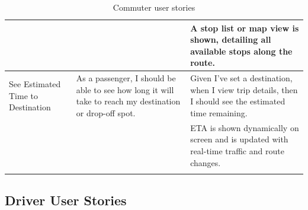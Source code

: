 \documentclass[a4paper,12pt]{article}
\begin{document}
\begin{longtable}{|p{4cm}|p{6cm}|p{5cm}|}
& & A stop list or map view is shown, detailing all available stops along the route. \\
\hline
See Estimated Time to Destination & As a passenger, I should be able to see how long it will take to reach my destination or drop-off spot. & Given I’ve set a destination, when I view trip details, then I should see the estimated time remaining. \\
& & ETA is shown dynamically on screen and is updated with real-time traffic and route changes. \\
\hline
\caption{Commuter user stories}
\label{tab:commuter-user-stories}
\end{longtable}

\subsection{Driver User Stories}
\end{document}
